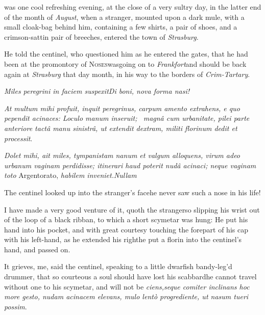 \documentclass{article}
\begin{document}
 was one cool refreshing evening,
at the close of a very sultry day, in the latter end of the month
of \textit{August}, when a stranger, mounted upon a dark mule, with a
small cloak-bag behind him, containing a few shirts, a pair of
shoes, and a crimson-sattin pair of breeches, entered the town of
\textit{Strasburg.}

He told the centinel, who questioned him as he entered the
gates, that he had been at the promontory of
\textsc{Noses}\tsk was\break going on to
\textit{Frankfort}\tsh and should be back again at
\textit{Strasburg} that day month, in his way to the borders of
\textit{Crim-\break Tartary}.

\pagestyle{fancy}
\textit{Miles peregrini in faciem suspexit\tsh Di boni, nova
forma nasi!}

\vspace{20pt}

\textit{At multum mihi profuit, inquit peregrinus, carpum amento
extrahens, e quo pependit acinaces: Loculo manum inse\-ruit; \et\ magnâ cum
urbanitate, pilei parte anteriore tactâ manu sinistrâ,
ut extendit dextram, militi florinum dedit et processit}.

\vspace{40pt}

\textit{Dolet mihi, ait miles, tympanistam na\-num et valgum alloquens,
virum adeo urbanum vaginam perdidisse; itinerari haud poterit
nudâ acinaci; neque vaginam toto} Argentorato, \textit{habilem
inveniet.\tsh Nullam 
}

The centinel looked up into the stran\-ger’s
face\tsh he never saw such a nose in his life!


\tsk I have made a very good venture of it, quoth the
stranger\tsk so slipping his wrist out of the loop of a black
ribban, to which a short scymetar was hung: He put his hand
into his pocket, and with great courtesy touching the forepart of
his cap with his left-hand, as he extended his
right\tsk he put a florin into the centinel’s hand,
and passed on.

It grieves, me, said the centinel, speaking to a little dwarfish
bandy-leg’d drummer, that so courteous a soul should have
lost his scabbard\tsk he cannot travel without one to his
scymetar, and will not be\break
{}
\textit{ciens,\tsk seque comiter inclinans \tsk hoc more
gesto, nudam acinacem elevans, mulo lentò progrediente, ut
nasum tueri possim}.
\end{document}
